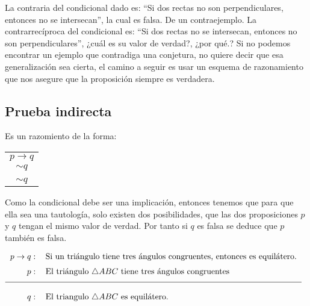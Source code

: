 La contraria del condicional dado es: \textquotedblleft Si dos rectas no son
perpendiculares, entonces no se intersecan\textquotedblright, la cual es
falsa. De un contraejemplo.\medskip
La contrarrecíproca del condicional es: \textquotedblleft Si dos rectas no se
intersecan, entonces no son perpendiculares\textquotedblright, ¿cuál es su
valor de verdad?, ¿por qué.?
Si no podemos encontrar un ejemplo que contradiga una conjetura, no quiere decir
que esa generalizaci\'on sea cierta, el camino a seguir es usar un esquema de
razonamiento que nos asegure que la proposici\'on siempre es verdadera.
\subsection{Prueba indirecta}
Es un razomiento de la forma:
\begin{center}
 \begin{tabular}{c}
$p\longrightarrow q$\\
$\sim q$ \\
\hline \\
$\sim q$
 \end{tabular}
\end{center}
 Como la condicional  debe ser una implicaci\'on, entonces tenemos que para
que ella sea una tautología, solo existen dos posibilidades, que las dos 
proposiciones $p$ y $q$ tengan el mismo valor de verdad. Por tanto si $q$ es
falsa se deduce que $p$ tambi\'en es falsa.
\begin{ejemplo}{\[%
\begin{tabular}
[t]{rl}%
$p\rightarrow q:$ & Si un triángulo tiene tres ángulos congruentes,
entonces es equilátero.\medskip\\
$p:$ & El triángulo $\triangle ABC$ tiene tres ángulos congruentes\medskip
\\\hline
 \\ $q:$ & El triangulo $\triangle ABC$ es equilátero.
\end{tabular}
\ \
\]}
 
\end{ejemplo}

